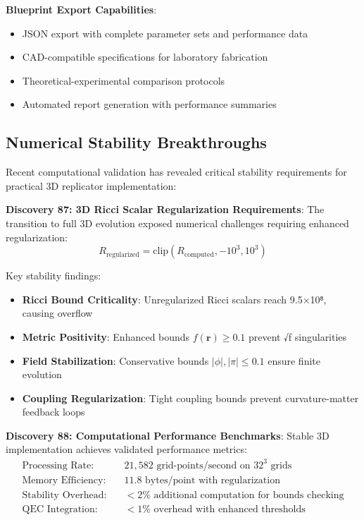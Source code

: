 \documentclass[11pt]{article}
\begin{document}
\textbf{Blueprint Export Capabilities}:
\begin{itemize}
\item JSON export with complete parameter sets and performance data
\item CAD-compatible specifications for laboratory fabrication
\item Theoretical-experimental comparison protocols
\item Automated report generation with performance summaries
\end{itemize}

\subsection{Numerical Stability Breakthroughs}

Recent computational validation has revealed critical stability requirements for practical 3D replicator implementation:

\textbf{Discovery 87: 3D Ricci Scalar Regularization Requirements}:
The transition to full 3D evolution exposed numerical challenges requiring enhanced regularization:
\begin{equation}
R_{\text{regularized}} = \text{clip}(R_{\text{computed}}, -10^{3}, 10^{3})
\end{equation}

Key stability findings:
\begin{itemize}
\item \textbf{Ricci Bound Criticality}: Unregularized Ricci scalars reach 9.5×10⁸, causing overflow
\item \textbf{Metric Positivity}: Enhanced bounds $f(\mathbf{r}) \geq 0.1$ prevent √f singularities  
\item \textbf{Field Stabilization}: Conservative bounds $|\phi|, |\pi| \leq 0.1$ ensure finite evolution
\item \textbf{Coupling Regularization}: Tight coupling bounds prevent curvature-matter feedback loops
\end{itemize}

\textbf{Discovery 88: Computational Performance Benchmarks}:
Stable 3D implementation achieves validated performance metrics:
\begin{align}
\text{Processing Rate:} &\quad 21,582 \text{ grid-points/second on } 32^3 \text{ grids} \\
\text{Memory Efficiency:} &\quad 11.8 \text{ bytes/point with regularization} \\
\text{Stability Overhead:} &\quad <2\% \text{ additional computation for bounds checking} \\
\text{QEC Integration:} &\quad <1\% \text{ overhead with enhanced thresholds}
\end{align}
\end{document}
